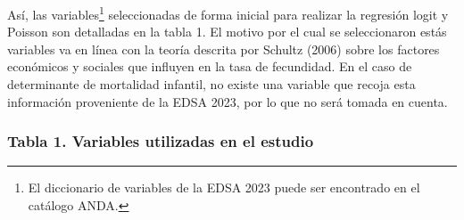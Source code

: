 \documentclass[Royal,times,sageh]{sagej}
\begin{document}
Así, las variables\footnote{El diccionario de variables de la EDSA 2023
  puede ser encontrado en el catálogo ANDA.} seleccionadas de forma
inicial para realizar la regresión logit y Poisson son detalladas en la
tabla 1. El motivo por el cual se seleccionaron estás variables va en
línea con la teoría descrita por Schultz (2006) sobre los factores
económicos y sociales que influyen en la tasa de fecundidad. En el caso
de determinante de mortalidad infantil, no existe una variable que
recoja esta información proveniente de la EDSA 2023, por lo que no será
tomada en cuenta.

\subsubsection{Tabla 1. Variables utilizadas en el
estudio}\label{tabla-1.-variables-utilizadas-en-el-estudio}
\end{document}
